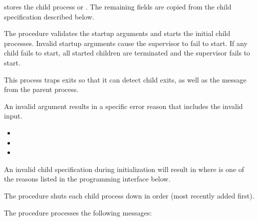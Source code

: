 \linebreak {} stores the child process or
. The remaining fields are copied from the child
specification described below.

 The  procedure validates the
startup arguments and starts the initial child processes. Invalid
startup arguments cause the supervisor to fail to start. If any child
fails to start, all started children are terminated and the supervisor
fails to start.

This process traps exits so that it can detect child exits, as well as
the  message from the parent process.

An invalid argument results in a specific error reason that includes
the invalid input.
\antipar
\begin{itemize}
  \item{}
  \item{}
  \item{}
\end{itemize}

An invalid child specification during initialization will result in
 where  is
one of the reasons listed in the programming interface below.

 The  procedure
shuts each child process down in order (most recently added first).

 The  procedure
processes the following messages:

